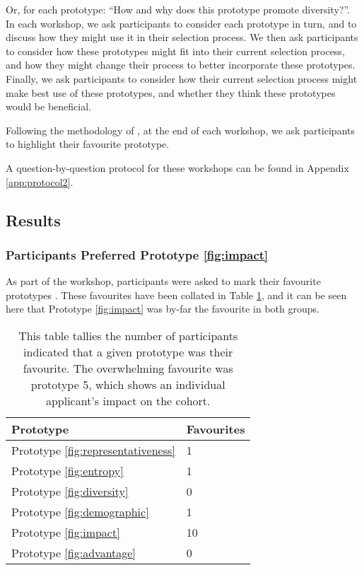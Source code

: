 \noindent Or, for each prototype: ``How and why does this prototype promote diversity?''. In each workshop, we ask participants to consider each prototype in turn, and to discuss how they might use it in their selection process. We then ask participants to consider how these prototypes might fit into their current selection process, and how they might change their process to better incorporate these prototypes. Finally, we ask participants to consider how their current selection process might make best use of these prototypes, and whether they think these prototypes would be beneficial. 

Following the methodology of \textcite{Gatian_1994,Griffiths_Johnson_Hartley_2007}, at the end of each workshop, we ask participants to highlight their favourite prototype.

A question-by-question protocol for these workshops can be found in Appendix \ref{app:protocol2}.

\subsection{Results}\label{ssec:results2}
\subsubsection{Participants Preferred Prototype \ref{fig:impact}}
As part of the workshop, participants were asked to mark their favourite prototypes \cite{Gatian_1994,Griffiths_Johnson_Hartley_2007}. These favourites have been collated in Table \ref{tab:favourites}, and it can be seen here that Prototype \ref{fig:impact} was by-far the favourite in both groups.

\begin{table}[htbp]
    \centering
    \caption{This table tallies the number of participants indicated that a given prototype was their favourite. The overwhelming favourite was prototype 5, which shows an individual applicant's impact on the cohort.}
    \label{tab:favourites}
    \begin{tabularx}{.25\textwidth}{lX}
        \toprule
        \textbf{Prototype} & \textbf{Favourites} \\
        \midrule
        Prototype \ref{fig:representativeness} & 1 \\
        Prototype \ref{fig:entropy} & 1 \\
        Prototype \ref{fig:diversity} & 0 \\
        Prototype \ref{fig:demographic} & 1 \\
        Prototype \ref{fig:impact} & 10 \\
        Prototype \ref{fig:advantage} & 0 \\
        \bottomrule
    \end{tabularx}
\end{table}

